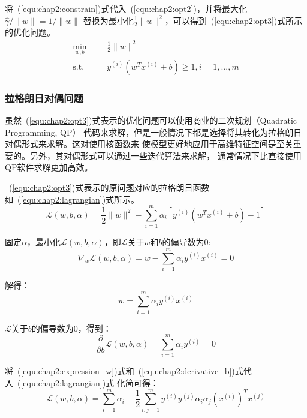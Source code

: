 将~(\ref{equ:chap2:constrain})式代入~(\ref{equ:chap2:opt2})，并将最大化$\hat{\gamma}/\|w\|=1/\|w\|$
替换为最小化$\frac{1}{2}\|w\|^2$，可以得到~(\ref{equ:chap2:opt3})式所示的优化问题。
\begin{equation}
  \label{equ:chap2:opt3}
  \begin{aligned}
    \min_{w,b} &
    & & \frac{1}{2}\|w\|^2 \\
    \text{s.t.} &
    & & y^{(i)}\left(w^Tx^{(i)}+b\right)\geq 1, i=1,...,m
  \end{aligned}
\end{equation}

\subsubsection{拉格朗日对偶问题}

虽然~(\ref{equ:chap2:opt3})式表示的优化问题可以使用商业的二次规划（Quadratic Programming, QP）
代码来求解，但是一般情况下都是选择将其转化为拉格朗日对偶形式来求解。这对使用核函数来
使模型更好地应用于高维特征空间是至关重要的。另外，其对偶形式可以通过一些迭代算法来求解，
通常情况下比直接使用QP软件求解更加高效。

~(\ref{equ:chap2:opt3})式表示的原问题对应的拉格朗日函数如~(\ref{equ:chap2:lagrangian})式所示。
\begin{equation}
  \label{equ:chap2:lagrangian}
  \mathcal{L}(w,b,\alpha)=\frac{1}{2}\|w\|^2-\sum_{i=1}^m \alpha_i\left[y^{(i)}\left(w^Tx^{(i)}+b\right)-1\right]
\end{equation}

固定$\alpha$，最小化$\mathcal{L}(w,b,\alpha)$，即$\mathcal{L}$关于$w$和$b$的偏导数为0:
\begin{equation}
  \label{equ:chap2:derivative_w}
  \nabla_w\mathcal{L}(w,b,\alpha)=w-\sum_{i=1}^{m}\alpha_iy^{(i)}x^{(i)}=0
\end{equation}

解得：
\begin{equation}
  \label{equ:chap2:expression_w}
  w=\sum_{i=1}^{m}\alpha_iy^{(i)}x^{(i)}
\end{equation}

$\mathcal{L}$关于$b$的偏导数为0，得到：
\begin{equation}
  \label{equ:chap2:derivative_b}
  \frac{\partial}{\partial b}\mathcal{L}(w,b,\alpha)=\sum_{i=1}^m\alpha_iy^{(i)}=0
\end{equation}

将~(\ref{equ:chap2:expression_w})式和~(\ref{equ:chap2:derivative_b})式代入~(\ref{equ:chap2:lagrangian})式
化简可得：
\begin{equation}
  \label{equ:chap2:dual_objective}
  \mathcal{L}(w,b,\alpha)=\sum_{i=1}^m\alpha_i-\frac{1}{2}\sum_{i,j=1}^m
  y^{(i)}y^{(j)}\alpha_i\alpha_j(x^{(i)})^Tx^{(j)}
\end{equation}

